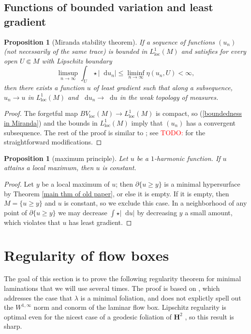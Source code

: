 \documentclass[reqno,11pt]{amsart}
\newcommand{\Hyp}{\mathbf H}
\newcommand*\dif{\mathop{}\!\mathrm{d}}
\newcommand{\loc}{\mathrm{loc}}
\newtheorem{proposition}[theorem]{Proposition}
\theoremstyle{definition}
\numberwithin{equation}{section}
\newcommand\todo[1]{\textcolor{red}{TODO: #1}}
\begin{document}
\subsection{Functions of bounded variation and least gradient}
\begin{proposition}[Miranda stability theorem]
	If a sequence of functions $(u_n)$ (not necessarily of the same trace) is bounded in $L^1_\loc(M)$ and satisfies for every open $U \Subset M$ with Lipschitz boundary
\begin{equation}\label{boundedness in Miranda}
	\limsup_{n \to \infty} \int_U \star |\dif u_n| \leq \liminf_{n \to \infty} \eta(u_n, U) < \infty,
\end{equation}
	then there exists a function $u$ of least gradient such that along a subsequence, $u_n \to u$ in $L^1_\loc(M)$ and $\dif u_n \to \dif u$ in the weak topology of measures.
\end{proposition}
\begin{proof}
The forgetful map $BV_\loc(M) \to L^1_\loc(M)$ is compact, so (\ref{boundedness in Miranda}) and the bounds in $L^1_\loc(M)$ imply that $(u_n)$ has a convergent subsequence.
The rest of the proof is similar to \cite[Teorema 3 and Osservazione 3]{Miranda67}; see \todo{\cite{BackusFLG}} for the straightforward modifications.
\end{proof}

\begin{proposition}[maximum principle]\label{max princip}
Let $u$ be a $1$-harmonic function.
If $u$ attains a local maximum, then $u$ is constant.
\end{proposition}
\begin{proof}
Let $y$ be a local maximum of $u$; then $\partial \{u \geq y\}$ is a minimal hypersurface by Theorem \ref{main thm of old paper}, or else it is empty. If it is empty, then $M = \{u \geq y\}$ and $u$ is constant, so we exclude this case.
In a neighborhood of any point of $\partial \{u \geq y\}$ we may decrease $\int \star |\dif u|$ by decreasing $y$ a small amount, which violates that $u$ has least gradient.
\end{proof}

\section{Regularity of flow boxes}\label{Regularity}
The goal of this section is to prove the following regularity theorem for minimal laminations that we will use several times.
The proof is based on \cite[Theorem 1.1]{Solomon86}, which addresses the case that $\lambda$ is a minimal foliation, and does not explictly spell out the $W^{1, \infty}$ norm and conorm of the laminar flow box.
Lipschitz regularity is optimal even for the nicest case of a geodesic foliation of $\Hyp^2$ \cite[\S1]{Solomon86}, so this result is sharp.
\end{document}
